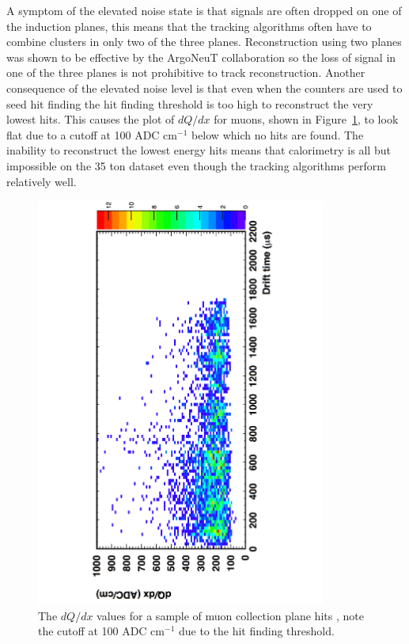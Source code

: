 A symptom of the elevated noise state is that signals are often dropped on one of the induction planes, this means that the tracking algorithms often have to combine clusters in only two of the three planes. Reconstruction using two planes was shown to be effective by the ArgoNeuT collaboration \citep{ArgoNeuT} so the loss of signal in one of the three planes is not prohibitive to track reconstruction. Another consequence of the elevated noise level is that even when the counters are used to seed hit finding the hit finding threshold is too high to reconstruct the very lowest hits. This causes the plot of $dQ/dx$ for muons, shown in Figure~\ref{fig:TingjunLifetime}, to look flat due to a cutoff at 100 ADC cm$^{-1}$ below which no hits are found. The inability to reconstruct the lowest energy hits means that calorimetry is all but impossible on the 35 ton dataset even though the tracking algorithms perform relatively well. \\

\begin{figure}[h!]
  \centering
  \includegraphics[width=0.85\textwidth]{TingjunLifetime}
  \caption[$dQ/dx$ in the 35 ton as a function of drift time]
          {The $dQ/dx$ values for a sample of muon collection plane hits \citep{TingjunLifetime}, note the cutoff at 100 ADC cm$^{-1}$ due to the hit finding threshold.}
  \label{fig:TingjunLifetime}
\end{figure}  


